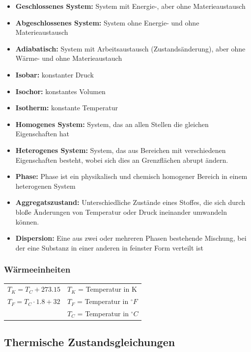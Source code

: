 \begin{minipage}{18cm}
\begin{itemize}
				\item \textbf{Geschlossenes System:} System mit Energie-, aber ohne Materieaustausch
				\item \textbf{Abgeschlossenes System:} System ohne Energie- und ohne Materieaustausch
				\item \textbf{Adiabatisch:} System mit Arbeitsaustausch (Zustandsänderung), aber ohne Wärme- und ohne Materieaustauch
				\item \textbf{Isobar:} konstanter Druck
				\item \textbf{Isochor:} konstantes Volumen
				\item \textbf{Isotherm:} konstante Temperatur
				\item \textbf{Homogenes System:} System, das an allen Stellen die gleichen Eigenschaften hat
				\item \textbf{Heterogenes System:} System, das aus Bereichen mit verschiedenen Eigenschaften besteht, wobei sich dies an Grenzflächen abrupt ändern.
				\item \textbf{Phase:} Phase ist ein physikalisch und chemisch homogener Bereich in einem heterogenen System
				\item  \textbf{Aggregatszustand:} Unterschiedliche Zustände eines Stoffes, die sich durch bloße Änderungen von Temperatur oder Druck ineinander umwandeln können.
				\item \textbf{Dispersion:} Eine aus zwei oder mehreren Phasen bestehende Mischung, bei der eine Substanz in einer anderen in feinster Form verteilt ist
			\end{itemize}
		\end{minipage}

	\subsubsection{Wärmeeinheiten}
		\begin{minipage}{14cm}
			\begin{tabular}{ p{4cm} | p{6cm} }
				$T_K = T_C + 273.15$
				& $T_K$ = Temperatur in K\\
				$T_F = T_C \cdot 1.8 + 32$
				& $T_F$ = Temperatur in $^\circ F$\\
				& $T_C$ = Temperatur in $^\circ C$
			\end{tabular} 
		\end{minipage}
	
	\subsection{Thermische Zustandsgleichungen}
